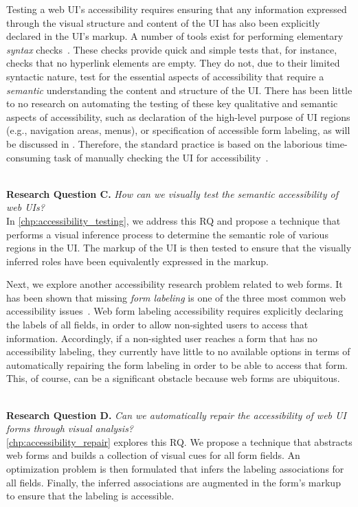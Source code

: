 Testing a web UI's accessibility requires ensuring that  
any information expressed through the visual structure and content of the UI has 
also been explicitly declared in the UI's markup. A number of tools  
exist for performing elementary \emph{syntax} checks~\cite{ukgov:audit:2018}. 
These checks provide quick and simple tests that, for instance, checks that no 
hyperlink elements are empty. They do not, due to their limited syntactic nature, 
test for the essential aspects of accessibility that require a \emph{semantic} 
understanding the content and structure of the UI. 
There has been little to no research on automating the testing of 
these key qualitative and semantic aspects of accessibility, 
such as declaration of the high-level purpose of UI regions (e.g., navigation areas, menus), or 
specification of accessible form labeling, as will be discussed in . 
Therefore, the standard practice is based on the laborious time-consuming task 
of manually checking the UI for accessibility~\cite{acosta:toward, bai:evaluation}.

\ \\ 
\textbf{Research Question C.}
\textit{How can we visually test the semantic accessibility of web UIs?}
\\ 
In \autoref{chp:accessibility_testing}, we address this RQ and propose 
a technique that performs a visual inference process to determine the 
semantic role of various regions in the UI. The markup of the UI is then 
tested to ensure that the visually inferred roles have been equivalently 
expressed in the markup. 

Next, we explore another accessibility research problem related to web forms. 
It has been shown that missing \emph{form labeling} is one of the three most 
common web accessibility issues~\cite{webaim1mil}.
Web form labeling accessibility requires explicitly declaring the 
labels of all fields, in order to allow non-sighted users 
to access that information. Accordingly, if a non-sighted user reaches a form 
that has no accessibility labeling, they currently have little to no available 
options in terms of automatically repairing the form labeling in order to be able 
to access that form. This, of course, can be a significant obstacle because web forms 
are ubiquitous. 

\ \\ 
\textbf{Research Question D.}
\textit{Can we automatically repair the accessibility of web UI forms through 
	visual analysis?}
\\ 
\autoref{chp:accessibility_repair} explores this RQ. We propose a technique 
that abstracts web forms and builds a collection of visual cues for all form 
fields. An optimization problem is then formulated that infers the labeling 
associations for all fields. Finally, the inferred associations are augmented 
in the form's markup to ensure that the labeling is accessible. 


